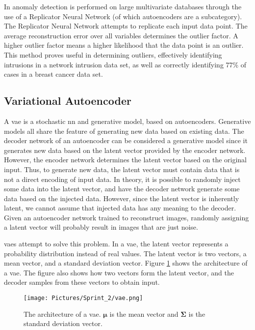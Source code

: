 In \cite{hawkins_he_williams_baxter_2002} anomaly detection is performed on large multivariate databases through the use of a Replicator Neural Network (of which autoencoders are a subcategory). The Replicator Neural Network attempts to replicate each input data point. The average reconstruction error over all variables determines the outlier factor. A higher outlier factor means a higher likelihood that the data point is an outlier. This method proves useful in determining outliers, effectively identifying intrusions in a network intrusion data set, as well as correctly identifying 77\% of cases in a breast cancer data set.

\subsection{Variational Autoencoder}\label{sc:vae}
A \gls{vae} is a stochastic \gls{nn} and generative model, based on autoencoders. Generative models all share the feature of generating new data based on existing data. The decoder network of an autoencoder can be considered a generative model since it generates new data based on the latent vector provided by the encoder network. However, the encoder network determines the latent vector based on the original input. Thus, to generate new data, the latent vector must contain data that is not a direct encoding of input data.
In theory, it is possible to randomly inject some data into the latent vector, and have the decoder network generate some data based on the injected data. However, since the latent vector is inherently latent, we cannot assume that injected data has any meaning to the decoder. Given an autoencoder network trained to reconstruct images, randomly assigning a latent vector will probably result in images that are just noise.

\Glspl{vae} attempt to solve this problem. In a \gls{vae}, the latent vector represents a probability distribution instead of real values. The latent vector is two vectors, a mean vector, and a standard deviation vector. Figure \ref{fig:architecture_vae} shows the architecture of a \gls{vae}. The figure also shows how two vectors form the latent vector, and the decoder samples from these vectors to obtain input.

\begin{figure}[htbp]
    \centering
    \texttt{[image: Pictures/Sprint\_2/vae.png]}
    \caption{The architecture of a \gls{vae}. $\boldsymbol{\mu}$ is the mean vector and $\boldsymbol{\Sigma}$ is the standard deviation vector.}
    \label{fig:architecture_vae}
\end{figure}

